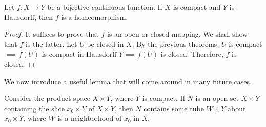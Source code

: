 \documentclass{article}
\begin{document}
    \begin{theorem}
    Let $f: X \longrightarrow Y$ be a bijective continuous function. If $X$ is compact and $Y$ is Hausdorff, then $f$ is a homeomorphism. 
    \end{theorem}
    \begin{proof}
    It suffices to prove that $f$ is an open or closed mapping. We shall show that $f$ is the latter. Let $U$ be closed in $X$. By the previous theorems, $U$ is compact $\implies f(U)$ is compact in Hausdorff $Y \implies f(U)$ is closed. Therefore, $f$ is closed. 
    \end{proof}

    We now introduce a useful lemma that will come around in many future cases. 

    \begin{lemma}
    Consider the product space $X \times Y$, where $Y$ is compact. If $N$ is an open set $X \times Y$ containing the slice $x_0 \times Y$ of $X \times Y$, then $N$ contains some tube $W \times Y$ about $x_0 \times Y$, where $W$ is a neighborhood of $x_0$ in $X$. 
    \end{lemma}
    \begin{center}
    \end{center}
\end{document}
